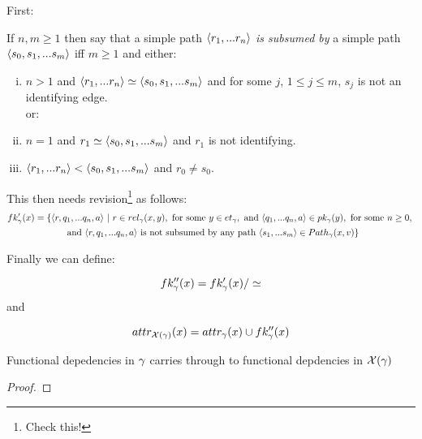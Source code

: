 First:
\begin{definition}
If $n,m \geq 1$ then say that a simple path $\tuple{r_1,...r_n}$ \textit{is subsumed by} a simple path 
$\tuple{s_0,s_1,...s_m}$ iff $m \geq 1$ and either:
\begin{enumerate} [(i)]

\item $n > 1$ and $\tuple{r_1,...r_n} \simeq  \tuple{s_0,s_1,...s_m}$ and 
for some $j$, $1 \leq j \leq m$, $s_j$ is not an identifying edge. \\
 \hspace{1cm} or:
\item $n=1$ and $r_1 \simeq \tuple{s_0,s_1,...s_m}$ and $r_1$ is not identifying.
\item $\tuple{r_1,...r_n} <  \tuple{s_0,s_1,...s_m}$ and $r_0 \neq s_0$.
\end{enumerate}
\end{definition}


This then needs revision\footnote{Check this!} as follows:
\begin{multline}
\fkp{x} = \setsuchthat{\tuple{r,q_1,...q_n,a}}
                      {r \in \rel{x}{y},
                                  \text{ for some } y \in \et,
																	\text{ and } \tuple{q_1,...q_n,a} \in \pk{y},
																	\text{ for some } n \geq 0,                   \right. \\        
											\left.		\text{ and } \tuple{r, q_1,...q_n,a}
																	\text{ is not subsumed by any path }
																	      \tuple{s_1,...s_m} \in \path{x}{v}
											}			                   
\end{multline}

Finally we can define:

\begin{equation}
\fkpp{x} = \fkp{x}/\simeq
\end{equation}
and 

\begin{equation}
\attr[\chiM]{x}  = \attr{x}  \cup  \fkpp{x}
\end{equation}


\begin{lemma}
\label{fdcarrythroughlemma}
Functional depedencies in $\genericmodel$ carries through to functional depdencies in $\genericphysical$ 
\end{lemma}
\begin{proof}

\end{proof}

